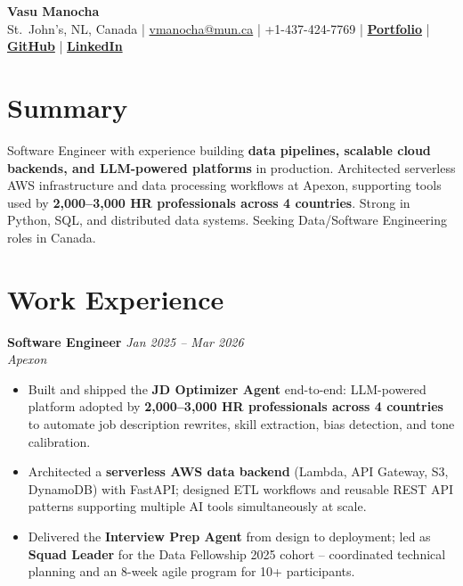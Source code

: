 \documentclass[a4paper,10pt]{article}
\begin{document}
\pagestyle{empty}

\begin{center}
  {\Large\textbf{\color{headblue}Vasu Manocha}}\\[2pt]
  \small St.\ John's, NL, Canada \;|\; \href{mailto:vmanocha@mun.ca}{vmanocha@mun.ca} \;|\; +1-437-424-7769 \;|\; \href{https://vasumanocha.com}{\textbf{Portfolio}} \;|\; \href{https://github.com/vm1610}{\textbf{GitHub}} \;|\; \href{https://www.linkedin.com/in/vasu-manocha-922b91223/}{\textbf{LinkedIn}}
\end{center}

\vspace{-4pt}

\section{Summary}
\small
Software Engineer with experience building \textbf{data pipelines, scalable cloud backends, and LLM-powered platforms} in production. Architected serverless AWS infrastructure and data processing workflows at Apexon, supporting tools used by \textbf{2,000--3,000 HR professionals across 4 countries}. Strong in Python, SQL, and distributed data systems. Seeking Data/Software Engineering roles in Canada.

\section{Work Experience}

\noindent\textbf{Software Engineer} \hfill \textit{\small Jan 2025 -- Mar 2026}\\
\textit{\small Apexon}
\begin{itemize}
  \item Built and shipped the \textbf{JD Optimizer Agent} end-to-end: LLM-powered platform adopted by \textbf{2,000--3,000 HR professionals across 4 countries} to automate job description rewrites, skill extraction, bias detection, and tone calibration.
  \item Architected a \textbf{serverless AWS data backend} (Lambda, API Gateway, S3, DynamoDB) with FastAPI; designed ETL workflows and reusable REST API patterns supporting multiple AI tools simultaneously at scale.
  \item Delivered the \textbf{Interview Prep Agent} from design to deployment; led as \textbf{Squad Leader} for the Data Fellowship 2025 cohort -- coordinated technical planning and an 8-week agile program for 10+ participants.
\end{itemize}
\end{document}
